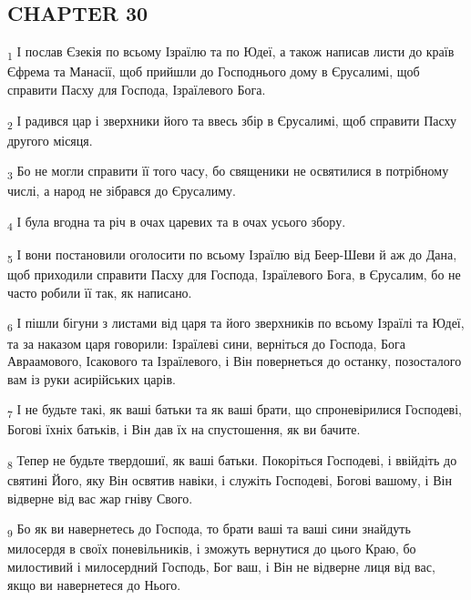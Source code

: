 \subsection{CHAPTER 30}
\begin{tcolorbox}
\textsubscript{1} І послав Єзекія по всьому Ізраїлю та по Юдеї, а також написав листи до країв Єфрема та Манасії, щоб прийшли до Господнього дому в Єрусалимі, щоб справити Пасху для Господа, Ізраїлевого Бога.
\end{tcolorbox}
\begin{tcolorbox}
\textsubscript{2} І радився цар і зверхники його та ввесь збір в Єрусалимі, щоб справити Пасху другого місяця.
\end{tcolorbox}
\begin{tcolorbox}
\textsubscript{3} Бо не могли справити її того часу, бо священики не освятилися в потрібному числі, а народ не зібрався до Єрусалиму.
\end{tcolorbox}
\begin{tcolorbox}
\textsubscript{4} І була вгодна та річ в очах царевих та в очах усього збору.
\end{tcolorbox}
\begin{tcolorbox}
\textsubscript{5} І вони постановили оголосити по всьому Ізраїлю від Беер-Шеви й аж до Дана, щоб приходили справити Пасху для Господа, Ізраїлевого Бога, в Єрусалим, бо не часто робили її так, як написано.
\end{tcolorbox}
\begin{tcolorbox}
\textsubscript{6} І пішли бігуни з листами від царя та його зверхників по всьому Ізраїлі та Юдеї, та за наказом царя говорили: Ізраїлеві сини, верніться до Господа, Бога Авраамового, Ісакового та Ізраїлевого, і Він повернеться до останку, позосталого вам із руки асирійських царів.
\end{tcolorbox}
\begin{tcolorbox}
\textsubscript{7} І не будьте такі, як ваші батьки та як ваші брати, що спроневірилися Господеві, Богові їхніх батьків, і Він дав їх на спустошення, як ви бачите.
\end{tcolorbox}
\begin{tcolorbox}
\textsubscript{8} Тепер не будьте твердошиї, як ваші батьки. Покоріться Господеві, і ввійдіть до святині Його, яку Він освятив навіки, і служіть Господеві, Богові вашому, і Він відверне від вас жар гніву Свого.
\end{tcolorbox}
\begin{tcolorbox}
\textsubscript{9} Бо як ви навернетесь до Господа, то брати ваші та ваші сини знайдуть милосердя в своїх поневільників, і зможуть вернутися до цього Краю, бо милостивий і милосердний Господь, Бог ваш, і Він не відверне лиця від вас, якщо ви навернетеся до Нього.
\end{tcolorbox}
